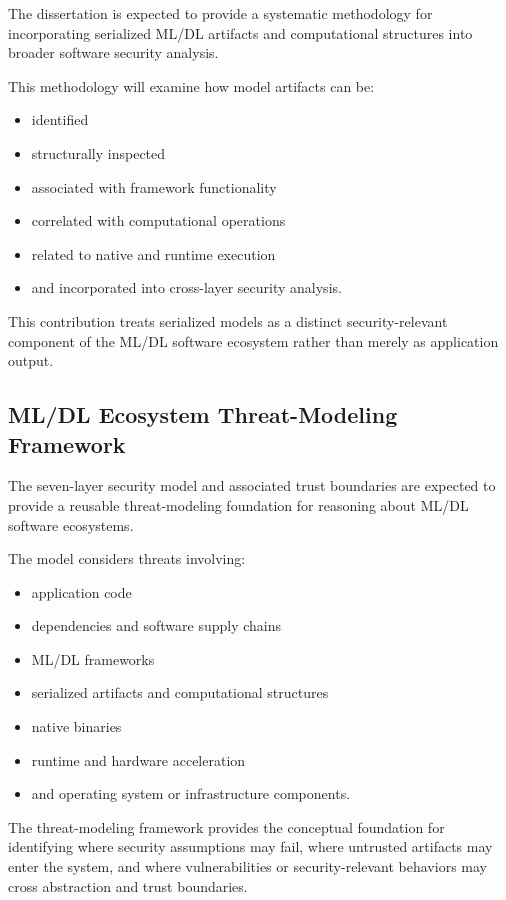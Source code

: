 \documentclass[
  12pt,
  letterpaper,
  oneside]{report}
\providecommand{\tightlist}{%
  \setlength{\itemsep}{0pt}\setlength{\parskip}{0pt}}
\begin{document}
The dissertation is expected to provide a systematic methodology for
incorporating serialized ML/DL artifacts and computational structures
into broader software security analysis.

This methodology will examine how model artifacts can be:

\begin{itemize}
\tightlist
\item
  identified
\item
  structurally inspected
\item
  associated with framework functionality
\item
  correlated with computational operations
\item
  related to native and runtime execution
\item
  and incorporated into cross-layer security analysis.
\end{itemize}

This contribution treats serialized models as a distinct
security-relevant component of the ML/DL software ecosystem rather than
merely as application output.

\subsection{ML/DL Ecosystem Threat-Modeling Framework}\label{1252-mldl-ecosystem-threat-modeling-framework}

The seven-layer security model and associated trust boundaries are
expected to provide a reusable threat-modeling foundation for reasoning
about ML/DL software ecosystems.

The model considers threats involving:

\begin{itemize}
\tightlist
\item
  application code
\item
  dependencies and software supply chains
\item
  ML/DL frameworks
\item
  serialized artifacts and computational structures
\item
  native binaries
\item
  runtime and hardware acceleration
\item
  and operating system or infrastructure components.
\end{itemize}

The threat-modeling framework provides the conceptual foundation for
identifying where security assumptions may fail, where untrusted
artifacts may enter the system, and where vulnerabilities or
security-relevant behaviors may cross abstraction and trust boundaries.
\end{document}
